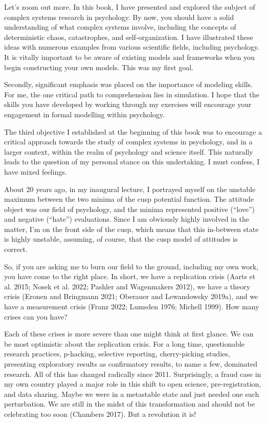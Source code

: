 \documentclass[
  a4paper,
  DIV=11,
  numbers=noendperiod,
  oneside]{scrreprt}
\begin{document}
Let's zoom out more. In this book, I have presented and explored the
subject of complex systems research in psychology. By now, you should
have a solid understanding of what complex systems involve, including
the concepts of deterministic chaos, catastrophes, and
self-organization. I have illustrated these ideas with numerous examples
from various scientific fields, including psychology. It is vitally
important to be aware of existing models and frameworks when you begin
constructing your own models. This was my first goal.

Secondly, significant emphasis was placed on the importance of modeling
skills. For me, the one critical path to comprehension lies in
simulation. I hope that the skills you have developed by working through
my exercises will encourage your engagement in formal modelling within
psychology.

The third objective I established at the beginning of this book was to
encourage a critical approach towards the study of complex systems in
psychology, and in a larger context, within the realm of psychology and
science itself. This naturally leads to the question of my personal
stance on this undertaking. I must confess, I have mixed feelings.

About 20 years ago, in my inaugural lecture, I portrayed myself on the
unstable maximum between the two minima of the cusp potential function.
The attitude object was our field of psychology, and the minima
represented positive (``love'') and negative (``hate'') evaluations.
Since I am obviously highly involved in the matter, I'm on the front
side of the cusp, which means that this in-between state is highly
unstable, assuming, of course, that the cusp model of attitudes is
correct.

So, if you are asking me to burn our field to the ground, including my
own work, you have come to the right place. In short, we have a
replication crisis (Aarts et al. 2015; Nosek et al. 2022; Pashler and
Wagenmakers 2012), we have a theory crisis (Eronen and Bringmann 2021;
Oberauer and Lewandowsky 2019a), and we have a measurement crisis (Franz
2022; Lumsden 1976; Michell 1999). How many crises can you have?

Each of these crises is more severe than one might think at first
glance. We can be most optimistic about the replication crisis. For a
long time, questionable research practices, p-hacking, selective
reporting, cherry-picking studies, presenting exploratory results as
confirmatory results, to name a few, dominated research. All of this has
changed radically since 2011. Surprisingly, a fraud case in my own
country played a major role in this shift to open science,
pre-registration, and data sharing. Maybe we were in a metastable state
and just needed one such perturbation. We are still in the midst of this
transformation and should not be celebrating too soon (Chambers 2017).
But a revolution it is!
\end{document}
